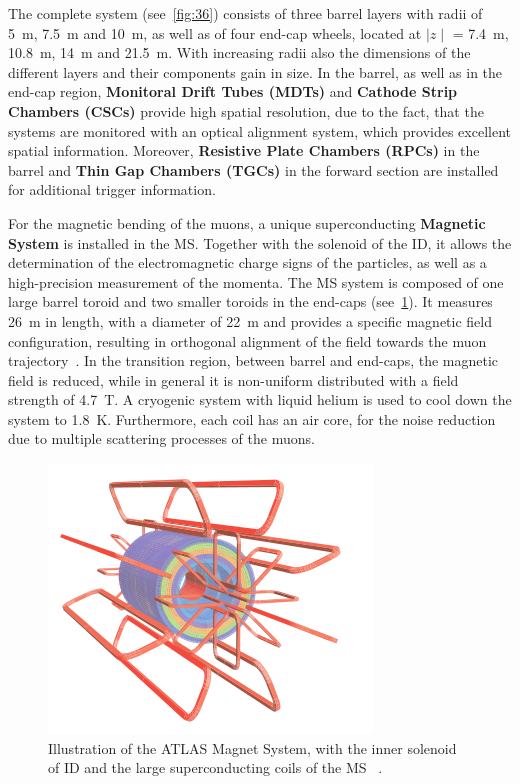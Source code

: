  The complete system (see~\cref{fig:36}) consists of three barrel layers with radii of  5~m, 7.5~m and 10~m, as well as of four end-cap wheels, located at $\mid z \mid$ = 7.4~m, 10.8~m, 14~m and 21.5~m. 
With increasing radii also the dimensions of the different layers and their components gain in size. In the barrel, as well as in the end-cap region, \textbf{Monitoral Drift Tubes (MDTs)} and \textbf{Cathode Strip Chambers (CSCs)} provide high spatial resolution, due to the fact, that the systems are monitored with an optical alignment system, which provides excellent spatial information. Moreover, \textbf{Resistive Plate Chambers (RPCs)} in the barrel and \textbf{Thin Gap Chambers (TGCs)} in the forward section are  installed for additional trigger information.



 For the magnetic bending of the muons, a unique superconducting \textbf{Magnetic System} is installed in the MS. Together with the solenoid of the ID, it allows the determination of the electromagnetic charge signs of the particles, as well as a high-precision measurement of the momenta. The MS system is composed of one large barrel toroid and two smaller toroids in the end-caps (see~\cref{fig:37}). It measures  26~m in length, with a diameter of 22~m and provides a specific magnetic field configuration, resulting in orthogonal alignment of the field towards the muon trajectory~\cite{ATLAS:1999uwa}. In the transition region, between barrel and end-caps, the magnetic field is reduced, while in general it is  non-uniform distributed  with a field strength of 4.7~T.  A cryogenic system with liquid helium is used to cool down the system to 1.8~K. Furthermore,  each coil has an air core, for the noise reduction due to  multiple scattering processes of the muons. 

\begin{figure}[h]
	\centering
	\includegraphics[width=0.4\linewidth]{Pics/cp3/37}
	\caption{Illustration of the ATLAS Magnet System, with the inner solenoid of ID and the large superconducting coils of the MS ~\cite{Aad:2008zzm}.} 
	\label{fig:37}
\end{figure}



